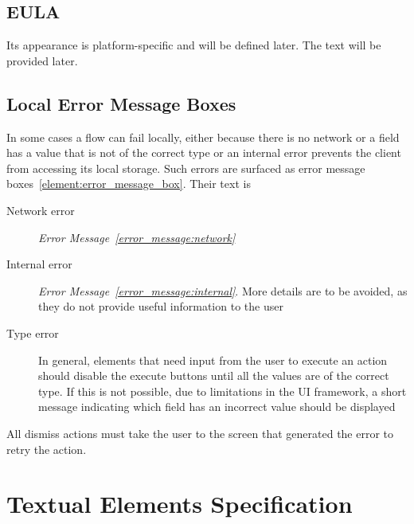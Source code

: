 \documentclass[a4paper,10pt]{article}
\newcommand{\errorMessageLabelText}{Error Message}
\newcommand{\errorMessageLabel}{error_message:}
\DeclareRobustCommand{\errorMessageTextRef}[1]{%
   \emph{\errorMessageLabelText~\ref{\errorMessageLabel#1}}}
\newcommand{\elementLabel}{element:}
\DeclareRobustCommand{\element}[2]{\subsection{#1}\label{\elementLabel#2}}
\DeclareRobustCommand{\elementRef}[1]{\ref{\elementLabel#1}}
\begin{document}
\element{EULA}{eula}
Its appearance is platform-specific and will be defined later. The text will be 
provided later.

\element{Local Error Message Boxes}{local_error_message_boxes}
In some cases a flow can fail locally, either because there is no network or a 
field has a value that is not of the correct type or an internal error prevents 
the client from accessing its local storage. Such errors are surfaced as error 
message boxes~\elementRef{error_message_box}. Their text is

\begin{description}
 \item[Network error] \errorMessageTextRef{network}
 \item[Internal error] \errorMessageTextRef{internal}. More details are to be 
avoided, as they do not provide useful information to the user
 \item[Type error] In general, elements that need input from the user to 
execute an action should disable the execute buttons until all the values are 
of the correct type. If this is not possible, due to limitations in the UI 
framework, a short message indicating which field has an incorrect value should 
be displayed
\end{description}

All dismiss actions must take the user to the screen that generated the error 
to retry the action.

\section{Textual Elements Specification}
\label{sec:text_spec}
\end{document}
